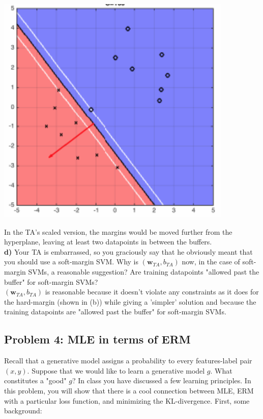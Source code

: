 \documentclass[a4paper]{article}
\begin{document}
\begin{center}
\includegraphics{SVM.png}
\end{center}
In the TA's scaled version, the margins would be moved further from the hyperplane, leaving at least two datapoints in between the buffers.\\

\textbf{d)} Your TA is embarrassed, so you graciously say that he obviously meant that you should use a soft-margin SVM. Why is $(\mathbf{w}_{TA},b_{TA})$ now, in the case of soft-margin SVMs, a reasonable suggestion? Are training datapoints "allowed past the buffer" for soft-margin SVMs? \\

$(\mathbf{w}_{TA},b_{TA})$ is reasonable because it doesn't violate any constraints as it does for the hard-margin (shown in (b)) while giving a 'simpler' solution and because the training datapoints are "allowed past the buffer" for soft-margin SVMs.


\subsection*{Problem 4: MLE in terms of ERM}
Recall that a generative model assigns a probability to every features-label pair $(x,y)$. Suppose that we would like to learn a generative model $g$. What constitutes a "good" $g$? In class you have discussed a few learning principles. In this problem, you will show that there is a cool connection between MLE, ERM with a particular loss function, and minimizing the KL-divergence. First, some background:\\
\end{document}
